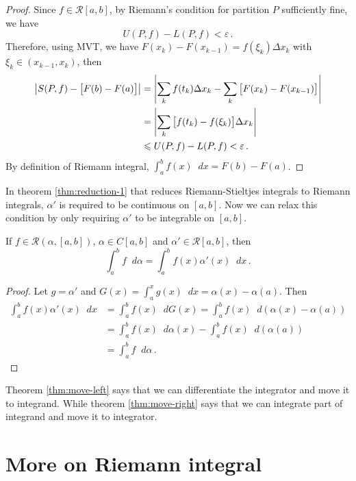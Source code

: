 \documentclass{article}
\newcommand{\Riemann}{\mathcal R}
\DeclarePairedDelimiter\abs{\lvert}{\rvert}
\newcommand{\dd}{\mathop{}\!d}
\begin{document}
\begin{proof}
    Since $ f \in \Riemann[a, b] $, by Riemann's condition for partition $ P $ sufficiently fine, we have
    \[ 
        U(P, f) - L(P, f) < \varepsilon \,.
    \]
    Therefore, using MVT, we have $ F(x_k) - F(x_{k-1}) = f(\xi_k) \Delta x_k $ with $ \xi_k \in (x_{k-1}, x_k) $, then
    \begin{align*}
        \abs*{ S(P, f) - \big[ F(b) - F(a) \big] } &= \abs*{ \sum_{k} f(t_k) \Delta x_k - \sum_{k} \big[ F(x_k) - F(x_{k-1}) \big] }  \\
        &= \abs*{ \sum_{k} \big[ f(t_k) - f(\xi_k) \big] \Delta x_k } \\
        &\leqslant U(P, f) - L(P, f) < \varepsilon \,.
    \end{align*}
    By definition of Riemann integral, $ \int_a^b f(x) \dd x = F(b) - F(a) $.
\end{proof}

In theorem \ref{thm:reduction-1} that reduces Riemann-Stieltjes integrals to Riemann integrals, $ \alpha' $ is required to be continuous on $ [a, b] $. Now we can relax this condition by only requiring $ \alpha' $ to be integrable on $ [a, b] $.

\begin{theorem} \label{thm:move-left}
    If $ f \in \Riemann(\alpha, [a, b]) $, $ \alpha \in C[a, b] $ and $ \alpha' \in \Riemann[a, b] $, then
    \[ 
        \int_a^b f \dd \alpha = \int_a^b f(x) \alpha'(x) \dd x \,.
    \]
\end{theorem}

\begin{proof}
    Let $ g = \alpha' $ and $ G(x) = \int_a^x g(x) \dd x = \alpha(x) - \alpha(a) $. Then
    \begin{align*}
        \int_a^b f(x) \alpha'(x) \dd x &= \int_a^b f(x) \dd G(x) = \int_a^b f(x) \dd (\alpha(x) - \alpha(a)) \\
        &= \int_a^b f(x) \dd \alpha(x) - \int_a^b f(x) \dd (\alpha(a)) \\
        &= \int_a^b f \dd \alpha \,.
    \end{align*}
\end{proof}

Theorem \ref{thm:move-left} says that we can differentiate the integrator and move it to integrand. While theorem \ref{thm:move-right} says that we can integrate part of integrand and move it to integrator.

\section{More on Riemann integral}
\end{document}
